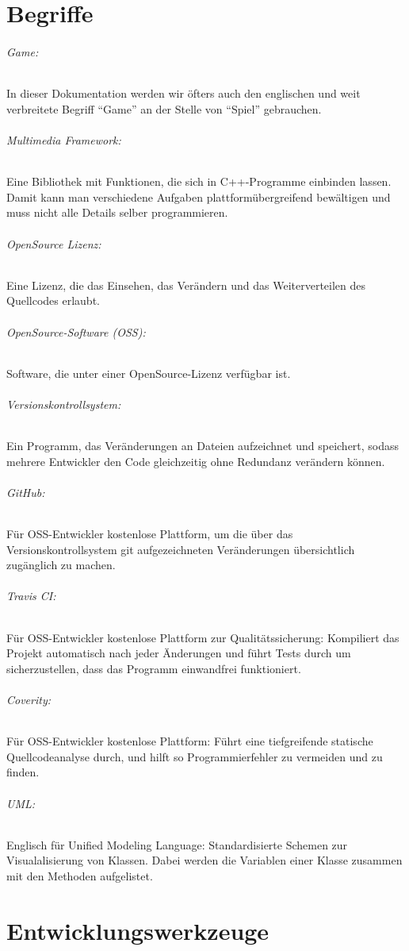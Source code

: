 \documentclass[11pt,a4paper]{scrbook}
\newcommand{\q}[1]{``#1''}
\begin{document}
\chapter{Begriffe}
\subparagraph{Game:}
In dieser Dokumentation werden wir öfters auch den englischen und weit verbreitete Begriff \q{Game} an der Stelle von \q{Spiel} gebrauchen.

\subparagraph{Multimedia Framework:}
Eine Bibliothek mit Funktionen, die sich in C++-Programme einbinden lassen. Damit kann man verschiedene Aufgaben plattformübergreifend bewältigen und muss nicht alle Details selber programmieren.

\subparagraph{OpenSource Lizenz:}

Eine Lizenz, die das Einsehen, das Verändern und das Weiterverteilen des Quellcodes erlaubt.

\subparagraph{OpenSource-Software (OSS):}
Software, die unter einer OpenSource-Lizenz verfügbar ist.

\subparagraph{Versionskontrollsystem:}
Ein Programm, das Veränderungen an Dateien aufzeichnet und speichert, sodass mehrere Entwickler den Code gleichzeitig ohne Redundanz verändern können.

\subparagraph{GitHub:}
Für OSS-Entwickler kostenlose Plattform, um die über das Versionskontrollsystem git aufgezeichneten Veränderungen übersichtlich zugänglich zu machen.

\subparagraph{Travis CI:}
Für OSS-Entwickler kostenlose Plattform zur Qualitätssicherung: Kompiliert das Projekt automatisch nach jeder Änderungen und führt Tests durch um sicherzustellen, dass das Programm einwandfrei funktioniert.

\subparagraph{Coverity:}
Für OSS-Entwickler kostenlose Plattform: Führt eine tiefgreifende statische Quellcodeanalyse durch, und hilft so Programmierfehler zu vermeiden und zu finden.

\subparagraph{UML:}
Englisch für Unified Modeling Language: Standardisierte Schemen zur Visualalisierung von Klassen. Dabei werden
die Variablen einer Klasse zusammen mit den Methoden aufgelistet.


\chapter{Entwicklungswerkzeuge}
\end{document}
